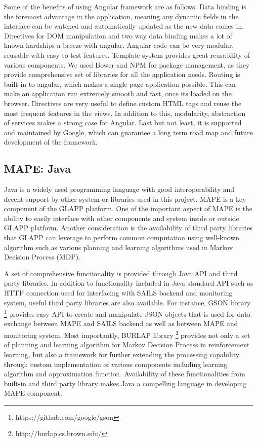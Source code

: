 \documentclass{seal_thesis}
\begin{document}
Some of the benefits of using Angular framework are as follows. 
Data binding is the foremost advantage in the application, meaning any dynamic fields in the interface can be watched and automatically updated as the new data comes in. 
Directives for DOM manipulation and two way data binding makes a lot of known hardships a breeze with angular. 
Angular code can be very modular, reusable with easy to test features. 
Template system provides great reusability of various components. 
We used Bower and NPM for package management, as they provide comprehensive set of libraries for all the application needs. 
Routing is built-in to angular, which makes a single page application possible. 
This can make an application run extremely smooth and fast, once its loaded on the browser. 
Directives are very useful to define custom HTML tags and reuse the most frequent features in the views. 
In addition to this, modularity, abstraction of services makes a strong case for Angular. 
Last but not least, it is supported and maintained by Google, which can guarantee a long term road map and future development of the framework.

\subsection{MAPE: Java}
Java is a widely used programming language with good interoperability and decent support by other system or libraries used in this project.
MAPE is a key component of the GLAPP platform.
One of the important aspect of MAPE is the ability to easily interface with other components and system inside or outside GLAPP platform.
Another consideration is the availability of third party libraries that GLAPP can leverage to perform common computation using well-known algorithm such as various planning and learning algorithms used in Markov Decision Process (MDP).

A set of comprehensive functionality is provided through Java API and third party libraries.
In addition to functionality included in Java standard API such as HTTP connection used for interfacing with SAILS backend and monitoring system, useful third party libraries are also available.
For instance, GSON library \footnote{https://github.com/google/gson} provides easy API to create and manipulate JSON objects that is used for data exchange between MAPE and SAILS backend as well as between MAPE and monitoring system.
Most importantly, BURLAP library \footnote{http://burlap.cs.brown.edu/} provides not only a set of planning and learning algorithm for Markov Decision Process in reinforcement learning, but also a framework for further extending the processing capability through custom implementation of various components including learning algorithm and approximation function.
Availability of these functionalities from built-in and third party library makes Java a compelling language in developing MAPE component.
\end{document}
